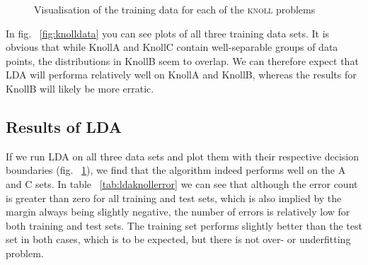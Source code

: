 \documentclass{article}
\begin{document}
\begin{figure}
  
  \caption{Visualisation of the training data for each of the \textsc{knoll} problems}
  \label{fig:ldaknollplots}
\end{figure}

In fig. ~\ref{fig:knolldata} you can see plots of all three training data sets. It is obvious
that while KnollA and KnollC contain well-separable groups of data points, the distributions in KnollB
seem to overlap. We can therefore expect that LDA will performa relatively well on KnollA and KnollB, whereas
the results for KnollB will likely be more erratic. 

\subsection{Results of LDA}
If we run LDA on all three data sets and plot them with their respective decision boundaries (fig. ~\ref{fig:ldaknollplots}), we find 
that the algorithm indeed performs well on the A and C sets. In table ~\ref{tab:ldaknollerror} we can see that although the error count is greater than zero for all 
training and test sets, which is also implied by the margin always being slightly negative, the number of errors
is relatively low for both training and test sets. The training set performs slightly better than the test set in both 
cases, which is to be expected, but there is not over- or underfitting problem.
\end{document}
